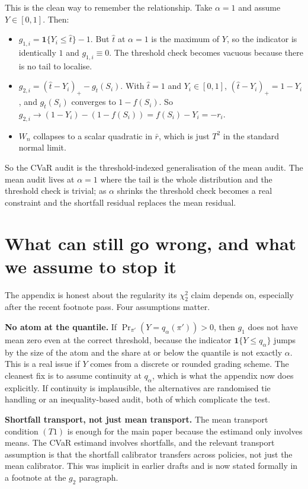 \documentclass[11pt]{article}
\newcommand{\one}{\mathbf{1}}
\newcommand{\pprime}{\pi'}
\newcommand{\that}{\hat t}
\begin{document}
This is the clean way to remember the relationship. Take $\alpha = 1$ and assume $Y \in [0,1]$. Then:

\begin{itemize}
\item $g_{1,i} = \one\{Y_i \le \that\} - 1$. But $\that$ at $\alpha=1$ is the maximum of $Y$, so the indicator is identically $1$ and $g_{1,i} \equiv 0$. The threshold check becomes vacuous because there is no tail to localise.
\item $g_{2,i} = (\that - Y_i)_+ - g_{\that}(S_i)$. With $\that = 1$ and $Y_i \in [0,1]$, $(\that - Y_i)_+ = 1 - Y_i$, and $g_{\that}(S_i)$ converges to $1 - f(S_i)$. So $g_{2,i} \to (1 - Y_i) - (1 - f(S_i)) = f(S_i) - Y_i = -r_i$.
\item $W_n$ collapses to a scalar quadratic in $\bar r$, which is just $T^2$ in the standard normal limit.
\end{itemize}

So the CVaR audit is the threshold-indexed generalisation of the mean audit. The mean audit lives at $\alpha = 1$ where the tail is the whole distribution and the threshold check is trivial; as $\alpha$ shrinks the threshold check becomes a real constraint and the shortfall residual replaces the mean residual.

\section*{What can still go wrong, and what we assume to stop it}

The appendix is honest about the regularity its $\chi^{2}_{2}$ claim depends on, especially after the recent footnote pass. Four assumptions matter.

\textbf{No atom at the quantile.} If $\Pr_{\pprime}(Y = q_{\alpha}(\pprime)) > 0$, then $g_1$ does not have mean zero even at the correct threshold, because the indicator $\one\{Y \le q_\alpha\}$ jumps by the size of the atom and the share at or below the quantile is not exactly $\alpha$. This is a real issue if $Y$ comes from a discrete or rounded grading scheme. The cleanest fix is to assume continuity at $q_\alpha$, which is what the appendix now does explicitly. If continuity is implausible, the alternatives are randomised tie handling or an inequality-based audit, both of which complicate the test.

\textbf{Shortfall transport, not just mean transport.} The mean transport condition $(T1)$ is enough for the main paper because the estimand only involves means. The CVaR estimand involves shortfalls, and the relevant transport assumption is that the shortfall calibrator transfers across policies, not just the mean calibrator. This was implicit in earlier drafts and is now stated formally in a footnote at the $g_2$ paragraph.
\end{document}

